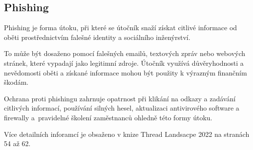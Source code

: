 \subsection{Phishing}

Phishing je forma útoku, při které se útočník snaží získat citlivé informace od oběti prostřednictvím falešné identity a sociálního inženýrství.

To může být dosaženo pomocí falešných emailů, textových zpráv nebo webových stránek, které vypadají jako legitimní zdroje. Útočník využívá důvěryhodnosti a nevědomosti oběti a získané informace mohou být použity k výrazným finančním škodám.

Ochrana proti phishingu zahrnuje opatrnost při klikání na odkazy a zadávání citlivých informací, používání silných hesel, aktualizaci antivirového software a firewally a~pravidelné školení zaměstnanců ohledně této formy útoku.

Více detailních inforamcí je obsaženo v knize Thread Landsacpe 2022 na stranách 54 až 62. \cite{enisa}